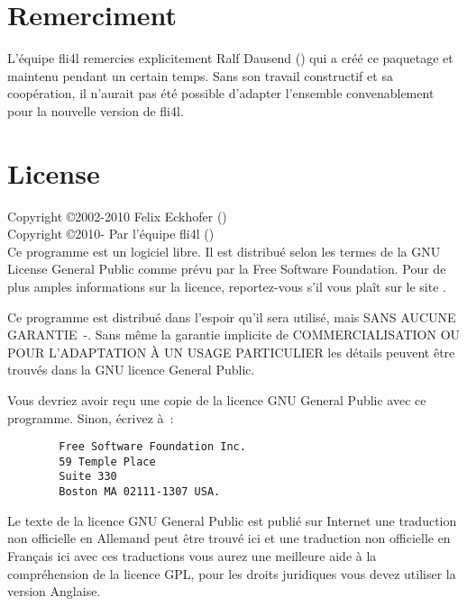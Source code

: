 \section{Remerciment}

L'équipe fli4l remercies explicitement Ralf Dausend ()
qui a créé ce paquetage et maintenu pendant un certain temps. Sans son travail
constructif et sa coopération, il n'aurait pas été possible d'adapter l'ensemble
convenablement pour la nouvelle version de fli4l.

\section{License}

Copyright \copyright  2002-2010 Felix Eckhofer () \\
Copyright \copyright  2010-     Par l'équipe fli4l () \\

Ce programme est un logiciel libre. Il est distribué selon les termes
de la GNU License General Public comme prévu par la Free Software Foundation.
Pour de plus amples informations sur la licence, reportez-vous
s'il vous plaît sur le site .

Ce programme est distribué dans l'espoir qu'il sera utilisé, mais SANS AUCUNE
GARANTIE~-. Sans même la garantie implicite de COMMERCIALISATION OU POUR
L'ADAPTATION À UN USAGE PARTICULIER les détails peuvent être trouvés dans
la GNU licence General Public.

Vous devriez avoir reçu une copie de la licence GNU General Public avec ce
programme. Sinon, écrivez à~:

\begin{verbatim}
		Free Software Foundation Inc.
		59 Temple Place
		Suite 330
		Boston MA 02111-1307 USA.
\end{verbatim}

Le texte de la licence GNU General Public est publié sur Internet
 une traduction non officielle en
Allemand peut être trouvé ici 
et une traduction non officielle en Français ici 
avec ces traductions vous aurez une meilleure aide à la compréhension de la
licence GPL, pour les droits juridiques vous devez utiliser la version Anglaise.